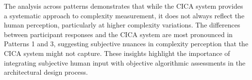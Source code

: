 The analysis across patterns demonstrates that while the CICA system provides a systematic approach to complexity measurement, it does not always reflect the human perception, particularly at higher complexity variations.
The differences between participant responses and the CICA system are most pronounced in Patterns 1 and 3, suggesting subjective nuances in complexity perception that the CICA system might not capture.
These insights highlight the importance of integrating subjective human input with objective algorithmic assessments in the architectural design process.



